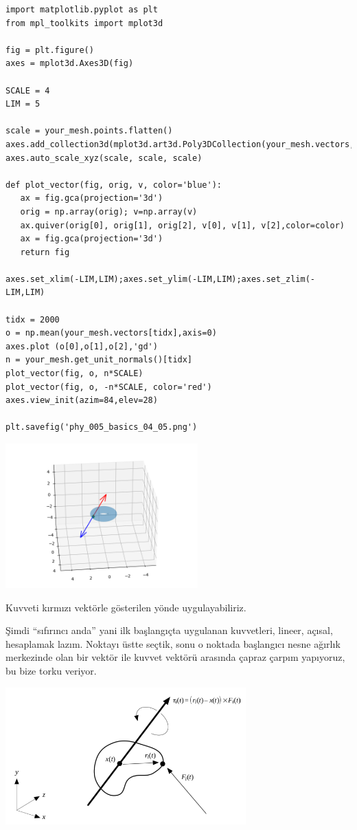 \documentclass[12pt,fleqn]{article}\usepackage{../../common}
\begin{document}
\begin{verbatim}
import matplotlib.pyplot as plt
from mpl_toolkits import mplot3d

fig = plt.figure()
axes = mplot3d.Axes3D(fig)

SCALE = 4
LIM = 5

scale = your_mesh.points.flatten()
axes.add_collection3d(mplot3d.art3d.Poly3DCollection(your_mesh.vectors,alpha=0.3))
axes.auto_scale_xyz(scale, scale, scale)

def plot_vector(fig, orig, v, color='blue'):
   ax = fig.gca(projection='3d')
   orig = np.array(orig); v=np.array(v)
   ax.quiver(orig[0], orig[1], orig[2], v[0], v[1], v[2],color=color)
   ax = fig.gca(projection='3d')  
   return fig

axes.set_xlim(-LIM,LIM);axes.set_ylim(-LIM,LIM);axes.set_zlim(-LIM,LIM)

tidx = 2000
o = np.mean(your_mesh.vectors[tidx],axis=0)
axes.plot (o[0],o[1],o[2],'gd')
n = your_mesh.get_unit_normals()[tidx]
plot_vector(fig, o, n*SCALE)
plot_vector(fig, o, -n*SCALE, color='red')
axes.view_init(azim=84,elev=28)

plt.savefig('phy_005_basics_04_05.png')
\end{verbatim}

\includegraphics[width=20em]{phy_005_basics_04_05.png}

Kuvveti kırmızı vektörle gösterilen yönde uygulayabiliriz.

Şimdi ``sıfırıncı anda'' yani ilk başlangıçta uygulanan kuvvetleri, lineer,
açısal, hesaplamak lazım. Noktayı üstte seçtik, sonu o noktada başlangıcı nesne
ağırlık merkezinde olan bir vektör ile kuvvet vektörü arasında çapraz çarpım
yapıyoruz, bu bize torku veriyor.

\includegraphics[width=25em]{phy_008_sim_rigbod_01.png}
\end{document}
